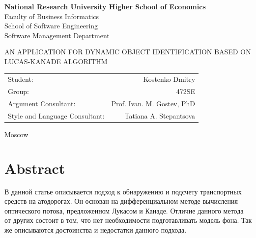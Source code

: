 \documentclass[12pt,a4paper,oneside,titlepage]{article}
\author{Kostenko}
\begin{document}
{
\thispagestyle{empty}
\newpage
\centering

\textbf{
National Research University Higher School of Economics\\
}
Faculty of Business Informatics\\
School of Software Engineering\\
Software Management Department

\vfill


\begin{large}
\MakeTextUppercase{
An Application for Dynamic Object Identification Based on Lucas-Kanade Algorithm
}
\end{large}


\vfill

\begin{tabular}{lr}
Student: & Kostenko Dmitry \\
Group: & 472SE \\
Argument Consultant: & Prof. Ivan. M. Gostev, PhD \\
Style and Language Consultant: & Tatiana A. Stepantsova
\end{tabular}

\vspace{\fill}

Moscow\\ \number\year
\clearpage
}

\section*{Abstract}
{
В данной статье описывается подход к обнаружению и подсчету транспортных средств на атодорогах.
Он основан на дифференциальном методе вычисления оптического потока, предложенном Лукасом и Канаде.
Отличие данного метода от других состоит в том, что нет необходимости подготавливать модель фона.
Так же описываются достоинства и недостатки данного подхода.
}





{
\newpage
\centering
\tableofcontents
}











\newpage
\end{document}
